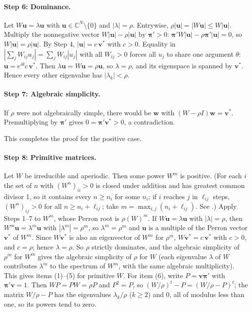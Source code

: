 \documentclass[../structural_economics_book.tex]{subfiles}
\begin{document}
\paragraph{Step 6: Dominance.} Let $W\mathbf{u} = \lambda\mathbf{u}$ with $\mathbf{u} \in \mathbb{C}^N \setminus \{0\}$ and $|\lambda| = \rho$. Entrywise, $\rho|\mathbf{u}| = |W\mathbf{u}| \leq W|\mathbf{u}|$. Multiply the nonnegative vector $W|\mathbf{u}| - \rho|\mathbf{u}|$ by $\boldsymbol{\pi}' > 0$: $\boldsymbol{\pi}'W|\mathbf{u}| - \rho\boldsymbol{\pi}'|\mathbf{u}| = 0$, so $W|\mathbf{u}| = \rho|\mathbf{u}|$. By Step 4, $|\mathbf{u}| = c\,\mathbf{v}^*$ with $c > 0$. Equality in $|\sum_j W_{ij}u_j| = \sum_j W_{ij}|u_j|$ with all $W_{ij} > 0$ forces all $u_j$ to share one argument $\theta$: $\mathbf{u} = e^{i\theta}c\,\mathbf{v}^*$. Then $\lambda\mathbf{u} = W\mathbf{u} = \rho\mathbf{u}$, so $\lambda = \rho$, and its eigenspace is spanned by $\mathbf{v}^*$. Hence every other eigenvalue has $|\lambda_k| < \rho$.

\paragraph{Step 7: Algebraic simplicity.} If $\rho$ were not algebraically simple, there would be $\mathbf{w}$ with $(W - \rho I)\mathbf{w} = \mathbf{v}^*$. Premultiplying by $\boldsymbol{\pi}'$ gives $0 = \boldsymbol{\pi}'\mathbf{v}^* > 0$, a contradiction.

This completes the proof for the positive case.

\paragraph{Step 8: Primitive matrices.} Let $W$ be irreducible and aperiodic. Then some power $W^m$ is positive. (For each $i$ the set of $n$ with $(W^n)_{ii} > 0$ is closed under addition and has greatest common divisor 1, so it contains every $n \geq n_i$ for some $n_i$; if $i$ reaches $j$ in $\ell_{ij}$ steps, $(W^n)_{ij} > 0$ for all $n \geq n_i + \ell_{ij}$; take $m = \max_{i,j}(n_i + \ell_{ij})$. See \citealp[Ch.~1 and Appendix~A]{seneta2006nonnegative}.) Apply Steps 1--7 to $W^m$, whose Perron root is $\rho(W)^m$. If $W\mathbf{u} = \lambda\mathbf{u}$ with $|\lambda| = \rho$, then $W^m\mathbf{u} = \lambda^m\mathbf{u}$ with $|\lambda^m| = \rho^m$, so $\lambda^m = \rho^m$ and $\mathbf{u}$ is a multiple of the Perron vector $\mathbf{v}^*$ of $W^m$. Since $W\mathbf{v}^*$ is also an eigenvector of $W^m$ for $\rho^m$, $W\mathbf{v}^* = c\,\mathbf{v}^*$ with $c > 0$, and $c = \rho$; hence $\lambda = \rho$. So $\rho$ strictly dominates, and the algebraic simplicity of $\rho^m$ for $W^m$ gives the algebraic simplicity of $\rho$ for $W$ (each eigenvalue $\lambda$ of $W$ contributes $\lambda^m$ to the spectrum of $W^m$, with the same algebraic multiplicity). This gives items (1)--(5) for primitive $W$. For item (6), write $P = \mathbf{v}\boldsymbol{\pi}'$ with $\boldsymbol{\pi}'\mathbf{v} = 1$. Then $WP = PW = \rho P$ and $P^2 = P$, so $(W/\rho)^t - P = (W/\rho - P)^t$; the matrix $W/\rho - P$ has the eigenvalues $\lambda_k/\rho$ ($k \geq 2$) and $0$, all of modulus less than one, so its powers tend to zero.
\end{document}
